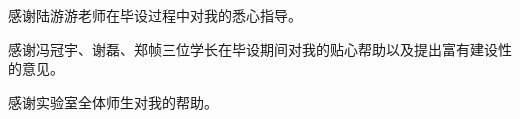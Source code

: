 \begin{acknowledgement}
    感谢陆游游老师在毕设过程中对我的悉心指导。
    
    感谢冯冠宇、谢磊、郑帧三位学长在毕设期间对我的贴心帮助以及提出富有建设性的意见。
    
    感谢实验室全体师生对我的帮助。

\end{acknowledgement}
